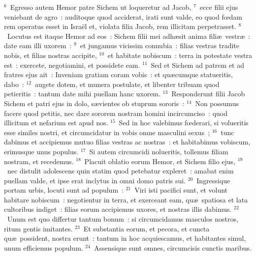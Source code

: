 ${}^{6}$~Egresso autem Hemor patre Sichem ut loqueretur ad Jacob,
${}^{7}$~ecce filii ejus veniebant de agro~: auditoque quod acciderat, irati sunt valde, eo quod fœdam rem operatus esset in Isra\"el et, violata filia Jacob, rem illicitam perpetrasset.
${}^{8}$~Locutus est itaque Hemor ad eos~: Sichem filii mei adh\ae sit anima fili\ae\ vestr\ae~: date eam illi uxorem~:
${}^{9}$~et jungamus vicissim connubia~: filias vestras tradite nobis, et filias nostras accipite,
${}^{10}$~et habitate nobiscum~: terra in potestate vestra est~: exercete, negotiamini, et possidete eam.
${}^{11}$~Sed et Sichem ad patrem et ad fratres ejus ait~: Inveniam gratiam coram vobis~: et qu\ae cumque statueritis, dabo~:
${}^{12}$~augete dotem, et munera postulate, et libenter tribuam quod petieritis~: tantum date mihi puellam hanc uxorem.
${}^{13}$~Responderunt filii Jacob Sichem et patri ejus in dolo, s\ae vientes ob stuprum sororis~:
${}^{14}$~Non possumus facere quod petitis, nec dare sororem nostram homini incircumciso~: quod illicitum et nefarium est apud nos.
${}^{15}$~Sed in hoc valebimus fœderari, si volueritis esse similes nostri, et circumcidatur in vobis omne masculini sexus~;
${}^{16}$~tunc dabimus et accipiemus mutuo filias vestras ac nostras~: et habitabimus vobiscum, erimusque unus populus.
${}^{17}$~Si autem circumcidi nolueritis, tollemus filiam nostram, et recedemus.
${}^{18}$~Placuit oblatio eorum Hemor, et Sichem filio ejus,
${}^{19}$~nec distulit adolescens quin statim quod petebatur expleret~: amabat enim puellam valde, et ipse erat inclytus in omni domo patris sui.
${}^{20}$~Ingressique portam urbis, locuti sunt ad populum~:
${}^{21}$~Viri isti pacifici sunt, et volunt habitare nobiscum~: negotientur in terra, et exerceant eam, qu\ae\ spatiosa et lata cultoribus indiget~: filias eorum accipiemus uxores, et nostras illis dabimus.
${}^{22}$~Unum est quo differtur tantum bonum~: si circumcidamus masculos nostros, ritum gentis imitantes.
${}^{23}$~Et substantia eorum, et pecora, et cuncta qu\ae\ possident, nostra erunt~: tantum in hoc acquiescamus, et habitantes simul, unum efficiemus populum.
${}^{24}$~Assensique sunt omnes, circumcisis cunctis maribus.


